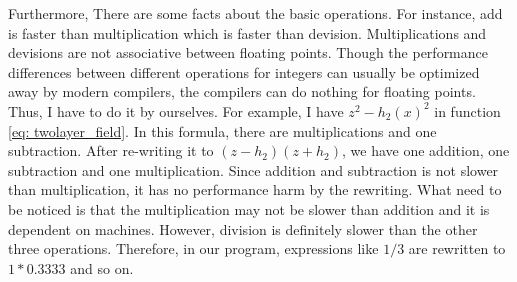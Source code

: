 \documentclass[12pt]{report}
\begin{document}
          Furthermore, There are some facts about the basic operations. For instance, add is 
          faster than multiplication which is faster than devision. Multiplications and devisions 
          are not associative between floating points. Though the performance differences between 
          different operations for integers can usually be optimized away by modern compilers, 
          the compilers can do nothing for floating points. Thus, I have to do it by ourselves. 
          For example, I have $z^2 - h_2\left(x\right)^2$ in function \ref{eq: twolayer_field}.
          In this formula, there are multiplications and one subtraction. After re-writing it to 
          $\left(z-h_2\right)\left(z + h_2\right)$, we have one addition, one subtraction and one 
          multiplication. Since addition and subtraction is not slower than multiplication, it 
          has no performance harm by the rewriting. What need to be noticed is that the 
          multiplication may not be slower than addition
          and it is dependent on machines. However, division is definitely slower than the other three operations. 
          Therefore, in our program, expressions like $1 / 3$ are rewritten to $1*0.3333$ and so on.  
      
\end{document}

